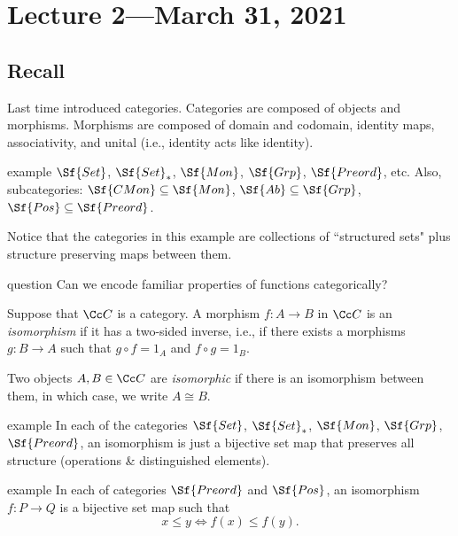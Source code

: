 \documentclass[class=article, crop=false]{standalone}
\begin{document}
\section{Lecture 2---March 31, 2021}

\subsection*{Recall}
Last time introduced categories. Categories are composed of objects and morphisms. Morphisms are composed of domain and codomain, identity maps, associativity, and unital (i.e., identity acts like identity).

\begin{understandingcheck}{example}
  $\Sf{Set}$, $\Sf{Set}_*$, $\Sf{Mon}$, $\Sf{Grp}$, $\Sf{Preord}$, etc. Also, subcategories: $\Sf{CMon} \subseteq \Sf{Mon}$, $\Sf{Ab} \subseteq \Sf{Grp}$, $\Sf{Pos} \subseteq \Sf{Preord}$.
\end{understandingcheck}

Notice that the categories in this example are collections of ``structured sets" plus structure preserving maps between them.

\begin{understandingcheck}{question}
  Can we encode familiar properties of functions categorically?
\end{understandingcheck}

\begin{defn}
  Suppose that $\Cc C$ is a category. A morphism $f\colon A\to B$ in $\Cc C$ is an \emph{isomorphism} if it has a two-sided inverse, i.e., if there exists a morphisms $g\colon B \to A$ such that $g\circ f = 1_A$ and $f \circ g = 1_B$.

  Two objects $A,B \in \Cc C$ are \emph{isomorphic} if there is an isomorphism between them, in which case, we write $A \cong B$.
\end{defn}

\begin{understandingcheck}{example}
  In each of the categories $\Sf{Set}$, $\Sf{Set}_*$, $\Sf{Mon}$, $\Sf{Grp}$, $\Sf{Preord}$, an isomorphism is just a bijective set map that preserves all structure (operations \& distinguished elements).
\end{understandingcheck}

\begin{understandingcheck}{example}
  In each of categories $\Sf{Preord}$ and $\Sf{Pos}$, an isomorphism $f\colon P \to Q$ is a bijective set map such that
    \[
      x\leq y \iff f(x) \leq f(y).
    \]
\end{understandingcheck}
\end{document}
